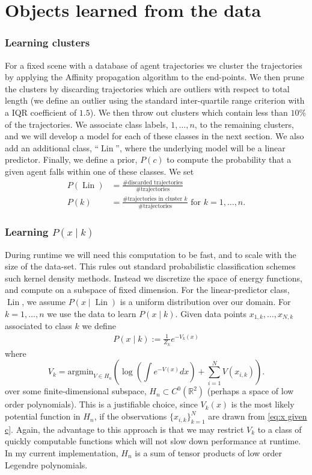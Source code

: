 \documentclass[12pt]{amsart}
\DeclareMathOperator{\Lin}{Lin}
\begin{document}
\section{Objects learned from the data}
\label{app:learning}

\subsubsection{Learning clusters}
For a fixed scene with a database of agent trajectories we cluster the trajectories by applying the Affinity propagation algorithm to the end-points.
We then prune the clusters by discarding trajectories which are outliers with respect to total length (we define an outlier using the standard inter-quartile range criterion with a IQR coefficient of $1.5$).
We then throw out clusters which contain less than $10\%$ of the trajectories.
We associate class labels, $1,\dots,n$,  to the remaining clusters, and we will develop a model for each of these classes in the next section.
We also add an additional class, ``$\Lin$'', where the underlying model will be a linear predictor.
Finally, we define a prior, $P(c)$ to compute the probability that a given agent falls within one of these classes.
We set 
\begin{align*}
	P(\Lin) &= \frac{ \text{\# discarded trajectories} }{ \text{ \# trajectories } } \\
	P(k) &= \frac{ \text{\# trajectories in cluster $k$} }{ \text{ \# trajectories } } \text{ for } k=1,\dots,n.
\end{align*}

\subsubsection{Learning $P(x \mid k)$ }
During runtime we will need this computation to be fast, and to scale with the size of the data-set.
This rules out standard probabilistic classification schemes such kernel density methods.
Instead we discretize the space of energy functions, and compute on a subspace of fixed dimension.
For the linear-predictor class, $\Lin$, we assume $P(x \mid \Lin )$ is a uniform distribution over our domain.
For $k = 1, \dots, n$ we use the data to learn $P(x \mid k)$.
Given data points $x_{1,k},\dots,x_{N,k}$ associated to class $k$ we define
\begin{align}
	P(x \mid k) := \frac{1}{Z_k } e^{-V_k(x) } \label{eq:x given c}
\end{align}
where
$$
	V_k =  \text{argmin}_{V \in H_n}  \left( \log \left( \int e^{ - V(x) } dx \right) + \sum_{i=1}^N V(x_{i,k} ) \right).
$$
over some finite-dimensional subspace, $H_n \subset C^0( \mathbb{R}^2)$ (perhaps a space of low order polynomials).
This is a justifiable choice, since $V_k(x)$ is the most likely potential function in $H_n$, if the observations $\{ x_{i,k}\}_{k=1}^N$ are drawn from \eqref{eq:x given c}.
Again, the advantage to this approach is that we may restrict $V_k$ to a class of quickly computable functions which will not slow down performance at runtime.
In my current implementation, $H_n$ is a sum of tensor products of low order Legendre polynomials.
\end{document}
